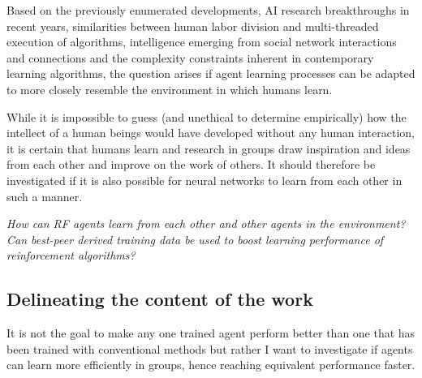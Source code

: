 \documentclass[12pt,a4paper]{article}
\begin{document}
Based on the previously enumerated developments, AI research breakthroughs in recent years, similarities between human labor division and multi-threaded execution of algorithms, intelligence emerging from social network interactions and connections and the complexity constraints inherent in contemporary learning algorithms, the question arises if agent learning processes can be adapted to more closely resemble the environment in which humans learn.

While it is impossible to guess (and unethical to determine empirically) how the intellect of a human beings would have developed without any human interaction, it is certain that humans learn and research in groups draw inspiration and ideas from each other and improve on the work of others. It should therefore be investigated if it is also possible for neural networks to learn from each other in such a manner.

\emph{How can RF agents learn from each other and other agents in the environment? Can best-peer derived training data be used to boost learning performance of reinforcement algorithms?}


\subsection{Delineating the content of the work}



It is not the goal to make any one trained agent perform better than one that has been trained with conventional methods but rather I want to investigate if agents can learn more efficiently in groups, hence reaching equivalent performance faster.
\end{document}
